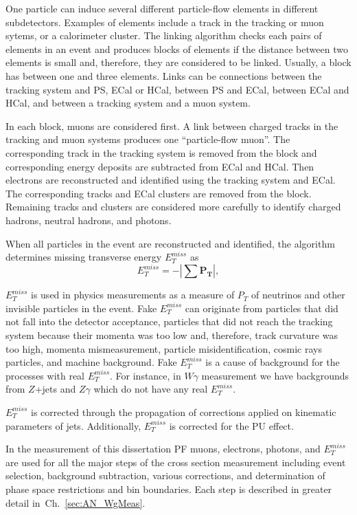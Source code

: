 One particle can induce several different particle-flow elements in different subdetectors. Examples of elements include a track in the tracking or muon sytems, or a calorimeter cluster. The linking algorithm checks each pairs of elements in an event and produces blocks of elements if the distance between two elements is small and, therefore, they are considered to be linked. Usually, a block has between one and three elements. Links can be connections between the tracking system and PS, ECal or HCal, between PS and ECal, between ECal and HCal, and between a tracking system and a muon system. 

In each block, muons are considered first. A link between charged tracks in the tracking and muon systems produces one ``particle-flow muon''. The corresponding track in the tracking system is removed from the block and corresponding energy deposits are subtracted from ECal and HCal. Then electrons are reconstructed and identified using the tracking system and ECal. The corresponding tracks and ECal clusters are removed from the block. Remaining tracks and clusters are considered more carefully to identify charged hadrons, neutral hadrons, and photons.

When all particles in the event are reconstructed and identified, the algorithm determines missing transverse energy $E_T^{miss}$ as 
\begin{equation}\label{eq:MET}
  E_T^{miss} = - | \sum \mathbf{P_T} |,
\end{equation}

$E_T^{miss}$ is used in physics measurements as a measure of $P_T$ of neutrinos and other invisible particles in the event. Fake $E_T^{miss}$ can originate from particles that did not fall into the detector acceptance, particles that did not reach the tracking system because their momenta was too low and, therefore, track curvature was too high, momenta mismeasurement, particle misidentification, cosmic rays particles, and machine background. Fake $E_T^{miss}$ is a cause of background for the processes with real $E_T^{miss}$. For instance, in $W\gamma$ measurement we have backgrounds from $Z$+jets and $Z\gamma$ which do not have any real $E_T^{miss}$. 

$E_T^{miss}$ is corrected through the propagation of corrections applied on kinematic parameters of jets. Additionally, $E_T^{miss}$ is corrected for the PU effect.

In the measurement of this dissertation PF muons, electrons, photons, and $E_T^{miss}$ are used for all the major steps of the cross section measurement including event selection, background subtraction, various corrections, and determination of phase space restrictions and bin boundaries. Each step is described in greater detail in~Ch.~\ref{sec:AN_WgMeas}. 
